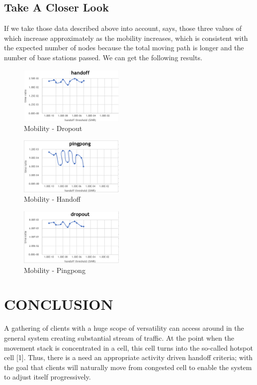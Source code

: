\documentclass[a4paper]{IEEEtran}
\begin{document}
\subsection{Take A Closer Look}
If we take those data described above into account, says, those three values ​​of which increase approximately as the mobility increases, which is consistent with the expected number of nodes because the total moving path is longer and the number of base stations passed. We can get the following results.
\begin{figure}[h]
    \includegraphics[width=0.45\textwidth]{small/dropout}
    \caption{Mobility - Dropout}
    \label{fig:mesh7}
\end{figure}
\begin{figure}[h]
        \includegraphics[width=0.45\textwidth]{small/handoff}
    \caption{Mobility - Handoff}
    \label{fig:mesh8}
\end{figure}
\begin{figure}[h]
    \includegraphics[width=0.45\textwidth]{small/pingpong}
    \caption{Mobility - Pingpong}
    \label{fig:mesh9}
\end{figure}
\section{\textbf{CONCLUSION}}
A gathering of clients with a huge scope of versatility can access around in the general system creating substantial stream of traffic. At the point when the movement stack is concentrated in a cell, this cell turns into the so-called hotspot cell [1]. Thus, there is a need an appropriate activity driven handoff criteria; with the goal that clients will naturally move from congested cell to enable the system to adjust itself progressively.
\end{document}
